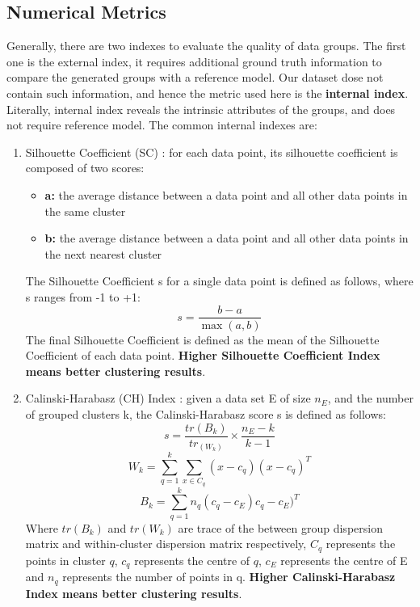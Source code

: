 \subsection{Numerical Metrics}
\label{sec:metrics}
Generally, there are two indexes to evaluate the quality of data groups. The first one is the external index, it requires additional ground truth information to compare the generated groups with a reference model. Our dataset dose not contain such information, and hence the metric used here is the \textbf{internal index}. Literally, internal index reveals the intrinsic attributes of the groups, and does not require reference model. The common internal indexes are:
\begin{enumerate}
    \item Silhouette Coefficient (SC) \cite{rousseeuw1987silhouettes}: for each data point, its silhouette coefficient is composed of two scores:
    \begin{itemize}
        \item \textbf{a:} the average distance between a data point and all other data points in the same cluster
        \item \textbf{b:} the average distance between a data point and all other data points in the next nearest cluster
    \end{itemize}
    The Silhouette Coefficient s for a single data point is defined as follows, where s ranges from -1 to +1:
    \begin{equation}
        s = \frac{b-a}{\max(a,b)} 
    \end{equation}
    The final Silhouette Coefficient is defined as the mean of the Silhouette Coefficient of each data point. \textbf{Higher Silhouette Coefficient Index means better clustering results}.
    \item Calinski-Harabasz (CH) Index \cite{calinski1974dendrite}: given a data set E of size $n_E$, and the number of grouped clusters k, the Calinski-Harabasz score s is defined as follows:
    \begin{equation}
        s = \frac{tr(B_k)}{tr_(W_k)} \times \frac{n_E - k}{k-1}
    \end{equation}
    \begin{equation}
        W_k = \sum_{q=1}^k \sum_{x \in C_q}(x-c_q)(x-c_q)^T
    \end{equation}
    \begin{equation}
        B_k = \sum_{q=1}^k n_q(c_q-c_E)c_q-c_E)^T
    \end{equation}
    Where $tr(B_k)$ and $tr(W_k)$ are trace of the between group dispersion matrix and within-cluster dispersion matrix respectively, $C_q$ represents the points in cluster $q$, $c_q$ represents the centre of $q$, $c_E$ represents the centre of E and $n_q$ represents the number of points in q. \textbf{Higher Calinski-Harabasz Index means better clustering results}.

\end{enumerate}
